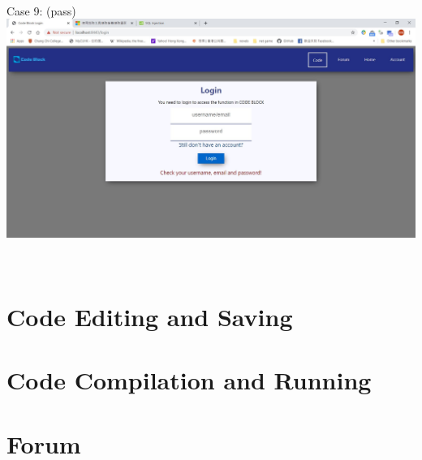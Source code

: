 ~

Case 9: (pass)\\
\includegraphics[scale=0.45]{Doc/Pics/case-5-2-9}

~

\section{Code Editing and Saving}

\section{Code Compilation and Running}

\section{Forum}
